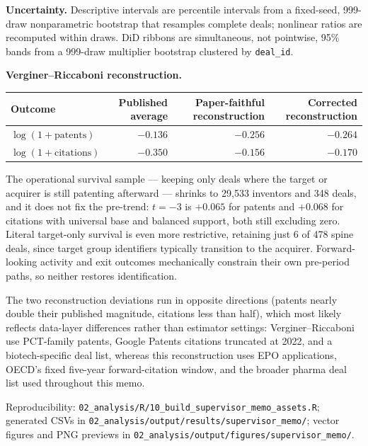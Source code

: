 \documentclass[10pt]{article}
\begin{document}
\textbf{Uncertainty.} Descriptive intervals are percentile intervals from a fixed-seed, 999-draw nonparametric bootstrap that resamples complete deals; nonlinear ratios are recomputed within draws. DiD ribbons are simultaneous, not pointwise, 95\% bands from a 999-draw multiplier bootstrap clustered by \texttt{deal\_id}.

\vspace{4pt}
\textbf{Verginer--Riccaboni reconstruction.}

{\small
\noindent\begin{tabularx}{\linewidth}{@{}>{\raggedright\arraybackslash}X R R R@{}}
\toprule
Outcome & Published average & Paper-faithful reconstruction & Corrected reconstruction \\
\midrule
$\log(1+\text{patents})$ & $-0.136$ & $-0.256$ & $-0.264$ \\
$\log(1+\text{citations})$ & $-0.350$ & $-0.156$ & $-0.170$ \\
\bottomrule
\end{tabularx}\par
}

The operational survival sample --- keeping only deals where the target or acquirer is still patenting afterward --- shrinks to 29,533 inventors and 348 deals, and it does not fix the pre-trend: $t=-3$ is $+0.065$ for patents and $+0.068$ for citations with universal base and balanced support, both still excluding zero. Literal target-only survival is even more restrictive, retaining just 6 of 478 spine deals, since target group identifiers typically transition to the acquirer. Forward-looking activity and exit outcomes mechanically constrain their own pre-period paths, so neither restores identification.

The two reconstruction deviations run in opposite directions (patents nearly double their published magnitude, citations less than half), which most likely reflects data-layer differences rather than estimator settings: Verginer--Riccaboni use PCT-family patents, Google Patents citations truncated at 2022, and a biotech-specific deal list, whereas this reconstruction uses EPO applications, OECD's fixed five-year forward-citation window, and the broader pharma deal list used throughout this memo.

\vfill
{\footnotesize\color{gray}Reproducibility: \texttt{02\_analysis/R/10\_build\_supervisor\_memo\_assets.R}; generated CSVs in \texttt{02\_analysis/output/results/supervisor\_memo/}; vector figures and PNG previews in \texttt{02\_analysis/output/figures/supervisor\_memo/}.}
\end{document}
